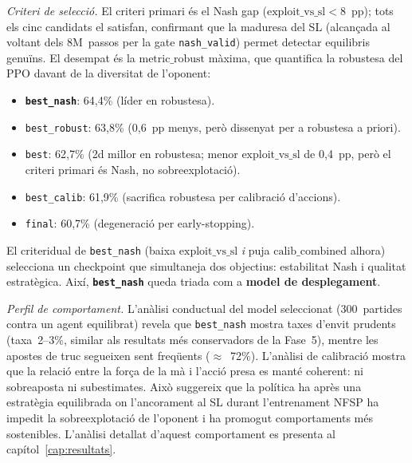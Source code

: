 \emph{Criteri de selecció.} El criteri primari és el Nash gap
(\(\text{exploit\_vs\_sl} < 8\)~pp); tots els cinc candidats el satisfan, confirmant que
la maduresa del \ac{SL} (alcançada al voltant dels 8M~passos per la gate \texttt{nash\_valid})
permet detectar equilibris genuïns. El desempat és la \(\text{metric\_robust}\) màxima,
que quantifica la robustesa del \ac{PPO} davant de la diversitat de l'oponent:

\begin{itemize}
  \item \textbf{\texttt{best\_nash}}: 64{,}4\% (líder en robustesa).
  \item \texttt{best\_robust}: 63{,}8\% (0{,}6~pp menys, però dissenyat per a robustesa a priori).
  \item \texttt{best}: 62{,}7\% (2d millor en robustesa; menor \(\text{exploit\_vs\_sl}\)
    de 0{,}4~pp, però el criteri primari és Nash, no sobreexplotació).
  \item \texttt{best\_calib}: 61{,}9\% (sacrifica robustesa per calibració d'accions).
  \item \texttt{final}: 60{,}7\% (degeneració per early-stopping).
\end{itemize}

El criteridual de \texttt{best\_nash} (baixa \(\text{exploit\_vs\_sl}\) \emph{i} puja
\(\text{calib\_combined}\) alhora) selecciona un checkpoint que simultaneja dos objectius:
estabilitat Nash i qualitat estratègica. Així, \textbf{\texttt{best\_nash}} queda triada
com a \textbf{model de desplegament}.

\emph{Perfil de comportament.} L'anàlisi conductual del model seleccionat (300~partides
contra un agent equilibrat) revela que \texttt{best\_nash} mostra taxes d'envit prudents
(taxa~2--3\%, similar als resultats més conservadors de la Fase~5), mentre les apostes de
truc segueixen sent freqüents (\(\approx\)~72\%). L'anàlisi de calibració mostra que la
relació entre la força de la mà i l'acció presa es manté coherent: ni sobreaposta ni
subestimates. Això suggereix que la política ha après una estratègia equilibrada on l'ancorament
al \ac{SL} durant l'entrenament \ac{NFSP} ha impedit la sobreexplotació de l'oponent i ha
promogut comportaments més sostenibles. L'anàlisi detallat d'aquest comportament es presenta
al capítol~\ref{cap:resultats}.

